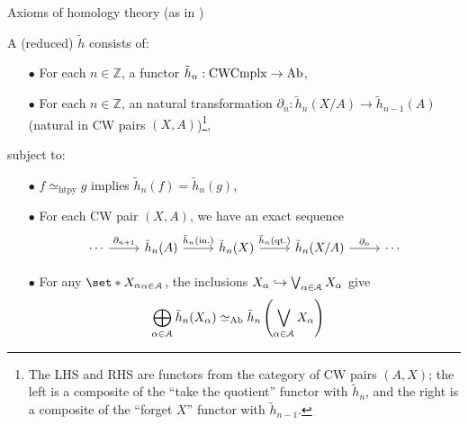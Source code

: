 \begin{frame}[t]{Axioms of homology theory (as in \cite{hatcher})} %

  \par{} A (reduced)  $\tilde{h}$ consists of:
  \begin{itemize}
    \pause
    \item[$\bullet$] For each $n \in \mathbb{Z}$, a functor $\tilde{h}_n : \mathrm{CWCmplx} \to \mathrm{Ab}$,
    \pause
    \item[$\bullet$] For each $n \in \mathbb{Z}$, an natural transformation $\partial_n : \tilde{h}_n (X/A) \to \tilde{h}_{n - 1} (A)$ (natural in CW pairs $(X, A)$)\footnote{The LHS and RHS are functors from the category of CW pairs $(A, X)$; the left is a composite of the ``take the quotient'' functor with $\tilde{h}_n$, and the right is a composite of the ``forget $X$'' functor with $\tilde{h}_{n - 1}$.},
  \end{itemize}
  \pause
  subject to:
  \begin{itemize}
    \item[$\bullet$] $f \simeq_{\text{htpy}} g$ implies $\tilde{h}_n (f) = \tilde{h}_n (g)$,
    \pause
    \item[$\bullet$] {
      For each CW pair $(X, A)$, we have an exact sequence
      \begin{align*}
        \begin{tikzcd}[
          ampersand replacement = \;
        ]
          \cdots
            \arrow[r, "\partial_{n + 1}"]
          \; \tilde{h}_n (A)
            \arrow[r, "\tilde{h}_n (\text{in.})"]
          \; \tilde{h}_n (X)
            \arrow[r, "\tilde{h}_n (\text{qt.})"]
          \; \tilde{h}_n (X / A)
            \arrow[r, "\partial_n"]
          \; \cdots
        \end{tikzcd}
      \end{align*}
    }
    \pause
    \item[$\bullet$] {
      For any $\set*{X_{\alpha}}_{\alpha \in \A}$, the inclusions $X_{\alpha} \hookrightarrow \bigvee_{\alpha \in \mathcal{A}} X_{\alpha}$ give
      \begin{align*}
        \bigoplus_{\alpha \in \mathcal{A}} \tilde{h}_n (X_{\alpha})
        &\simeq_{\mathrm{Ab}} \tilde{h}_n \left(
          \bigvee_{\alpha \in \mathcal{A}} X_{\alpha}
        \right)
      \end{align*}
    }
  \end{itemize}
  
\end{frame}

